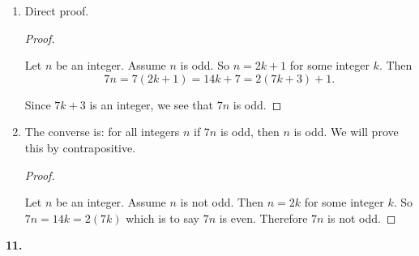 \documentclass[10pt,]{book}
\theoremstyle{plain}
\theoremstyle{definition}
\theoremstyle{definition}
\theoremstyle{definition}
\numberwithin{equation}{chapter}
\begin{document}
\begin{enumerate}[label=(\alph*)]
\item\hypertarget{li-1173}{}
                Direct proof.

                \begin{proof}\hypertarget{proof-52}{}

                    Let \(n\) be an integer. Assume \(n\) is odd. So \(n = 2k+1\) for some integer \(k\). Then
                    \begin{equation*}
                      7n = 7(2k+1) = 14k + 7 = 2(7k +3) + 1.
                    \end{equation*}
\par

                    Since \(7k + 3\) is an integer, we see that \(7n\) is odd.
\end{proof}


\item\hypertarget{li-1174}{}
                The converse is: for all integers \(n\) if \(7n\) is odd, then \(n\) is odd. We will prove this by contrapositive.

                \begin{proof}\hypertarget{proof-53}{}

                    Let \(n\) be an integer. Assume \(n\) is not odd. Then \(n = 2k\) for some integer \(k\). So \(7n = 14k = 2(7k)\) which is to say \(7n\) is even. Therefore \(7n\) is not odd.
\end{proof}


\end{enumerate}
\par\smallskip
\noindent\textbf{11.}\quad{}\leavevmode%
\end{document}
